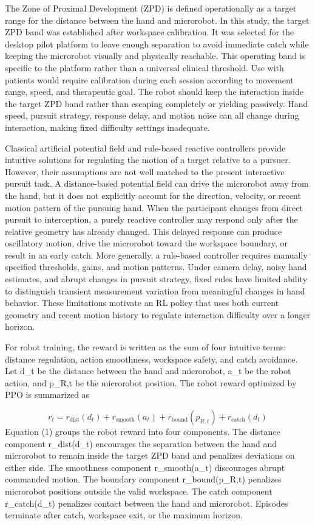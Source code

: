 \documentclass[letterpaper,journal]{IEEEtran}
\begin{document}
The Zone of Proximal Development (ZPD) is defined operationally as a target range for the distance between the hand and microrobot. In this study, the target ZPD band was established after workspace calibration. It was selected for the desktop pilot platform to leave enough separation to avoid immediate catch while keeping the microrobot visually and physically reachable. This operating band is specific to the platform rather than a universal clinical threshold. Use with patients would require calibration during each session according to movement range, speed, and therapeutic goal. The robot should keep the interaction inside the target ZPD band rather than escaping completely or yielding passively. Hand speed, pursuit strategy, response delay, and motion noise can all change during interaction, making fixed difficulty settings inadequate.

Classical artificial potential field and rule-based reactive controllers provide intuitive solutions for regulating the motion of a target relative to a pursuer. However, their assumptions are not well matched to the present interactive pursuit task. A distance-based potential field can drive the microrobot away from the hand, but it does not explicitly account for the direction, velocity, or recent motion pattern of the pursuing hand. When the participant changes from direct pursuit to interception, a purely reactive controller may respond only after the relative geometry has already changed. This delayed response can produce oscillatory motion, drive the microrobot toward the workspace boundary, or result in an early catch. More generally, a rule-based controller requires manually specified thresholds, gains, and motion patterns. Under camera delay, noisy hand estimates, and abrupt changes in pursuit strategy, fixed rules have limited ability to distinguish transient measurement variation from meaningful changes in hand behavior. These limitations motivate an RL policy that uses both current geometry and recent motion history to regulate interaction difficulty over a longer horizon.

For robot training, the reward is written as the sum of four intuitive terms: distance regulation, action smoothness, workspace safety, and catch avoidance. Let d\_t be the distance between the hand and microrobot, a\_t be the robot action, and p\_R,t be the microrobot position. The robot reward optimized by PPO is summarized as

\begin{equation}
r_t = r_{\mathrm{dist}}(d_t) + r_{\mathrm{smooth}}(a_t) + r_{\mathrm{bound}}(p_{R,t}) + r_{\mathrm{catch}}(d_t)
\end{equation}
Equation (1) groups the robot reward into four components. The distance component r\_dist(d\_t) encourages the separation between the hand and microrobot to remain inside the target ZPD band and penalizes deviations on either side. The smoothness component r\_smooth(a\_t) discourages abrupt commanded motion. The boundary component r\_bound(p\_R,t) penalizes microrobot positions outside the valid workspace. The catch component r\_catch(d\_t) penalizes contact between the hand and microrobot. Episodes terminate after catch, workspace exit, or the maximum horizon.
\end{document}
